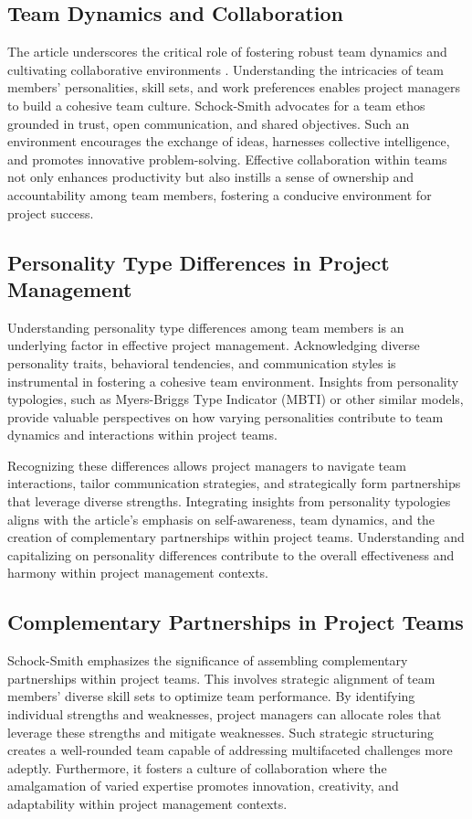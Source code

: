 \documentclass[runningheads]{llncs}
\begin{document}
\subsection{Team Dynamics and Collaboration}
The article underscores the critical role of fostering robust team dynamics and cultivating collaborative environments \cite{ref_10}. Understanding the intricacies of team members' personalities, skill sets, and work preferences enables project managers to build a cohesive team culture. Schock-Smith advocates for a team ethos grounded in trust, open communication, and shared objectives. Such an environment encourages the exchange of ideas, harnesses collective intelligence, and promotes innovative problem-solving. Effective collaboration within teams not only enhances productivity but also instills a sense of ownership and accountability among team members, fostering a conducive environment for project success.

\subsection{Personality Type Differences in Project Management}
Understanding personality type differences among team members is an underlying factor in effective project management. Acknowledging diverse personality traits, behavioral tendencies, and communication styles is instrumental in fostering a cohesive team environment. Insights from personality typologies, such as Myers-Briggs Type Indicator (MBTI) \cite{REF_7} or other similar models, provide valuable perspectives on how varying personalities contribute to team dynamics and interactions within project teams.

Recognizing these differences allows project managers to navigate team interactions, tailor communication strategies, and strategically form partnerships that leverage diverse strengths. Integrating insights from personality typologies aligns with the article's emphasis on self-awareness, team dynamics, and the creation of complementary partnerships within project teams. Understanding and capitalizing on personality differences contribute to the overall effectiveness and harmony within project management contexts.

\subsection{Complementary Partnerships in Project Teams}
Schock-Smith emphasizes the significance of assembling complementary partnerships within project teams. This involves strategic alignment of team members' diverse skill sets to optimize team performance. By identifying individual strengths and weaknesses, project managers can allocate roles that leverage these strengths and mitigate weaknesses. Such strategic structuring creates a well-rounded team capable of addressing multifaceted challenges more adeptly. \cite{ref_1} Furthermore, it fosters a culture of collaboration where the amalgamation of varied expertise promotes innovation, creativity, and adaptability within project management contexts.
\end{document}
